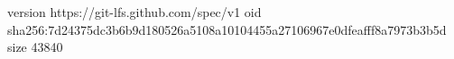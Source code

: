 version https://git-lfs.github.com/spec/v1
oid sha256:7d24375dc3b6b9d180526a5108a10104455a27106967e0dfeafff8a7973b3b5d
size 43840
